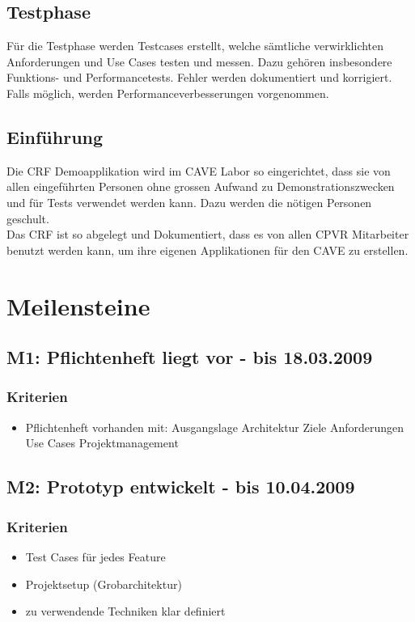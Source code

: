 \subsection{Testphase}
F\"ur die Testphase werden Testcases erstellt, welche s\"amtliche verwirklichten Anforderungen und Use Cases testen und messen. Dazu geh\"oren insbesondere Funktions- und Performancetests. Fehler werden dokumentiert und korrigiert. Falls m\"oglich, werden Performanceverbesserungen vorgenommen.

\subsection{Einf\"uhrung}
Die CRF Demoapplikation wird im CAVE Labor so eingerichtet, dass sie von allen eingef\"uhrten Personen ohne grossen Aufwand zu Demonstrationszwecken und f\"ur Tests verwendet werden kann. Dazu werden die n\"otigen Personen geschult.\\
Das CRF ist so abgelegt und Dokumentiert, dass es von allen CPVR Mitarbeiter benutzt werden kann, um ihre eigenen Applikationen f\"ur den CAVE zu erstellen.

\section{Meilensteine}
\subsection{M1: Pflichtenheft liegt vor - bis 18.03.2009}
\subsubsection{Kriterien}
\begin{itemize}
	\item Pflichtenheft vorhanden mit:
	\subitem Ausgangslage
	\subitem Architektur
	\subitem Ziele
	\subitem Anforderungen
	\subitem Use Cases
	\subitem Projektmanagement
\end{itemize}

\subsection{M2: Prototyp entwickelt - bis 10.04.2009}
\subsubsection{Kriterien}
\begin{itemize}
\item Test Cases f\"ur jedes Feature
\item Projektsetup (Grobarchitektur)
\item zu verwendende Techniken klar definiert
\end{itemize}


